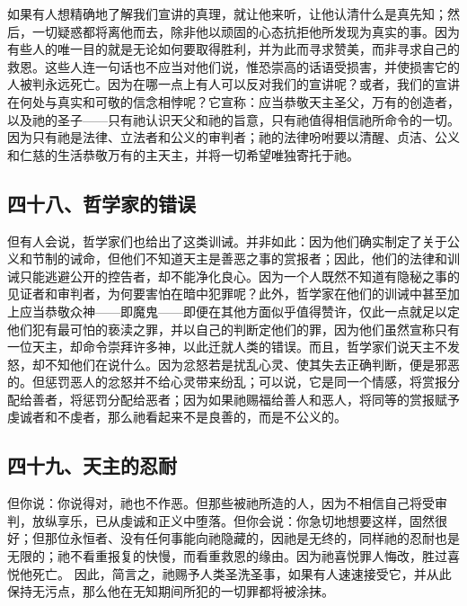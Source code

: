 如果有人想精确地了解我们宣讲的真理，就让他来听，让他认清什么是真先知；然后，一切疑惑都将离他而去，除非他以顽固的心态抗拒他所发现为真实的事。因为有些人的唯一目的就是无论如何要取得胜利，并为此而寻求赞美，而非寻求自己的救恩。这些人连一句话也不应当对他们说，惟恐崇高的话语受损害，并使损害它的人被判永远死亡。因为在哪一点上有人可以反对我们的宣讲呢？或者，我们的宣讲在何处与真实和可敬的信念相悖呢？它宣称：应当恭敬天主圣父，万有的创造者，以及祂的圣子——只有祂认识天父和祂的旨意，只有祂值得相信祂所命令的一切。因为只有祂是法律、立法者和公义的审判者；祂的法律吩咐要以清醒、贞洁、公义和仁慈的生活恭敬万有的主天主，并将一切希望唯独寄托于祂。\par


\subsection{四十八、哲学家的错误}

但有人会说，哲学家们也给出了这类训诫。并非如此：因为他们确实制定了关于公义和节制的诫命，但他们不知道天主是善恶之事的赏报者；因此，他们的法律和训诫只能逃避公开的控告者，却不能净化良心。因为一个人既然不知道有隐秘之事的见证者和审判者，为何要害怕在暗中犯罪呢？此外，哲学家在他们的训诫中甚至加上应当恭敬众神——即魔鬼——即便在其他方面似乎值得赞许，仅此一点就足以定他们犯有最可怕的亵渎之罪，并以自己的判断定他们的罪，因为他们虽然宣称只有一位天主，却命令崇拜许多神，以此迁就人类的错误。而且，哲学家们说天主不发怒，却不知他们在说什么。因为忿怒若是扰乱心灵、使其失去正确判断，便是邪恶的。但惩罚恶人的忿怒并不给心灵带来纷乱；可以说，它是同一个情感，将赏报分配给善者，将惩罚分配给恶者；因为如果祂赐福给善人和恶人，将同等的赏报赋予虔诚者和不虔者，那么祂看起来不是良善的，而是不公义的。\par


\subsection{四十九、天主的忍耐}

但你说：你说得对，祂也不作恶。但那些被祂所造的人，因为不相信自己将受审判，放纵享乐，已从虔诚和正义中堕落。但你会说：你急切地想要这样，固然很好；但那位永恒者、没有任何事能向祂隐藏的，因祂是无终的，同样祂的忍耐也是无限的；祂不看重报复的快慢，而看重救恩的缘由。因为祂喜悦罪人悔改，胜过喜悦他死亡。 因此，简言之，祂赐予人类圣洗圣事，如果有人速速接受它，并从此保持无污点，那么他在无知期间所犯的一切罪都将被涂抹。\par

